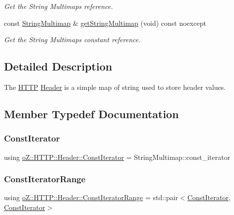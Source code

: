 \begin{DoxyCompactItemize}
\begin{DoxyCompactList}\small\item\em Get the String Multimap\textquotesingle{}s reference. \end{DoxyCompactList}\item 
const \mbox{\hyperlink{namespaceo_z_1_1_h_t_t_p_a339aac279d709cfa16148ad073500fc1}{String\+Multimap}} \& \mbox{\hyperlink{classo_z_1_1_h_t_t_p_1_1_header_af1ee1c1e6a882a605407683341e32a8f}{get\+String\+Multimap}} (void) const noexcept
\begin{DoxyCompactList}\small\item\em Get the String Multimap\textquotesingle{}s constant reference. \end{DoxyCompactList}\end{DoxyCompactItemize}


\subsection{Detailed Description}
The \mbox{\hyperlink{namespaceo_z_1_1_h_t_t_p}{H\+T\+TP}} \mbox{\hyperlink{classo_z_1_1_h_t_t_p_1_1_header}{Header}} is a simple map of string used to store header values. 

\subsection{Member Typedef Documentation}
\mbox{\label{classo_z_1_1_h_t_t_p_1_1_header_a509c1ea8f5b221246e6e49c01a115d69}} 
\subsubsection{\texorpdfstring{ConstIterator}{ConstIterator}}
{\footnotesize\ttfamily using \mbox{\hyperlink{classo_z_1_1_h_t_t_p_1_1_header_a509c1ea8f5b221246e6e49c01a115d69}{o\+Z\+::\+H\+T\+T\+P\+::\+Header\+::\+Const\+Iterator}} =  String\+Multimap\+::const\+\_\+iterator}

\mbox{\label{classo_z_1_1_h_t_t_p_1_1_header_a0823c7353e93de315929c96457563c3d}} 
\subsubsection{\texorpdfstring{ConstIteratorRange}{ConstIteratorRange}}
{\footnotesize\ttfamily using \mbox{\hyperlink{classo_z_1_1_h_t_t_p_1_1_header_a0823c7353e93de315929c96457563c3d}{o\+Z\+::\+H\+T\+T\+P\+::\+Header\+::\+Const\+Iterator\+Range}} =  std\+::pair$<$\mbox{\hyperlink{classo_z_1_1_h_t_t_p_1_1_header_a509c1ea8f5b221246e6e49c01a115d69}{Const\+Iterator}}, \mbox{\hyperlink{classo_z_1_1_h_t_t_p_1_1_header_a509c1ea8f5b221246e6e49c01a115d69}{Const\+Iterator}}$>$}

